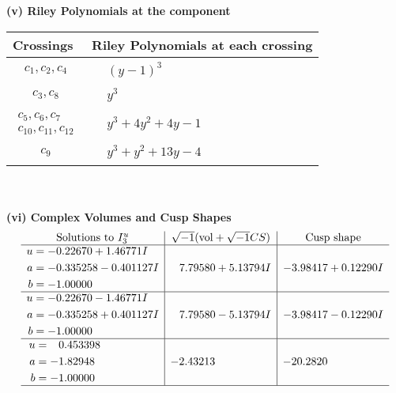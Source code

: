 \documentclass[1p]{elsarticle_modified}
\theoremstyle{definition}
\newcommand{\I}{\sqrt{-1}}
\begin{document}
\newpage\renewcommand{\arraystretch}{1}
\flushleft \textbf{(v) Riley Polynomials at the component}\newline \\
\begin{tabular}{m{50pt}|m{274pt}}
Crossings & \hspace{64pt}Riley Polynomials at each crossing \\
\hline $$\begin{aligned}c_{1},c_{2},c_{4}\end{aligned}$$&$\begin{aligned}
&(y-1)^3
\end{aligned}$\\
\hline $$\begin{aligned}c_{3},c_{8}\end{aligned}$$&$\begin{aligned}
&y^3
\end{aligned}$\\
\hline $$\begin{aligned}c_{5},c_{6},c_{7}\\c_{10},c_{11},c_{12}\end{aligned}$$&$\begin{aligned}
&y^3+4 y^2+4 y-1
\end{aligned}$\\
\hline $$\begin{aligned}c_{9}\end{aligned}$$&$\begin{aligned}
&y^3+y^2+13 y-4
\end{aligned}$\\
\hline
\end{tabular}\\~\\
\newpage\flushleft \textbf{(vi) Complex Volumes and Cusp Shapes}
$$\begin{array}{c|c|c}  
\text{Solutions to }I^u_{3}& \I (\text{vol} + \sqrt{-1}CS) & \text{Cusp shape}\\
 \hline 
\begin{aligned}
u &= -0.22670 + 1.46771 I \\
a &= -0.335258 - 0.401127 I \\
b &= -1.00000\phantom{ +0.000000I}\end{aligned}
 & \phantom{-}7.79580 + 5.13794 I & -3.98417 + 0.12290 I \\ \hline\begin{aligned}
u &= -0.22670 - 1.46771 I \\
a &= -0.335258 + 0.401127 I \\
b &= -1.00000\phantom{ +0.000000I}\end{aligned}
 & \phantom{-}7.79580 - 5.13794 I & -3.98417 - 0.12290 I \\ \hline\begin{aligned}
u &= \phantom{-}0.453398\phantom{ +0.000000I} \\
a &= -1.82948\phantom{ +0.000000I} \\
b &= -1.00000\phantom{ +0.000000I}\end{aligned}
 & -2.43213\phantom{ +0.000000I} & -20.2820\phantom{ +0.000000I}\\
 \hline 
 \end{array}$$\newpage\newpage\renewcommand{\arraystretch}{1}
\end{document}
